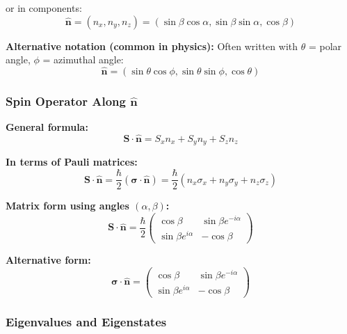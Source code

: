 \documentclass[11pt,a4paper]{article}
\begin{document}
or in components:
\begin{equation}
\hat{\mathbf{n}} = (n_x, n_y, n_z) = (\sin\beta\cos\alpha, \sin\beta\sin\alpha, \cos\beta)
\tag{S.21}
\end{equation}

\textbf{Alternative notation (common in physics):}
Often written with $\theta$ = polar angle, $\phi$ = azimuthal angle:
\begin{equation}
\hat{\mathbf{n}} = (\sin\theta\cos\phi, \sin\theta\sin\phi, \cos\theta)
\tag{S.22}
\end{equation}

\subsubsection{Spin Operator Along $\hat{\mathbf{n}}$}

\textbf{General formula:}
\begin{equation}
\boxed{\mathbf{S} \cdot \hat{\mathbf{n}} = S_x n_x + S_y n_y + S_z n_z}
\tag{S.23}
\end{equation}

\textbf{In terms of Pauli matrices:}
\begin{equation}
\boxed{\mathbf{S} \cdot \hat{\mathbf{n}} = \frac{\hbar}{2}(\boldsymbol{\sigma} \cdot \hat{\mathbf{n}}) = \frac{\hbar}{2}(n_x\sigma_x + n_y\sigma_y + n_z\sigma_z)}
\tag{S.24}
\end{equation}

\textbf{Matrix form using angles $(\alpha, \beta)$:}
\begin{equation}
\boxed{\mathbf{S} \cdot \hat{\mathbf{n}} = \frac{\hbar}{2}\begin{pmatrix}
\cos\beta & \sin\beta e^{-i\alpha} \\
\sin\beta e^{i\alpha} & -\cos\beta
\end{pmatrix}}
\tag{S.25}
\end{equation}

\textbf{Alternative form:}
\begin{equation}
\boldsymbol{\sigma} \cdot \hat{\mathbf{n}} = \begin{pmatrix}
\cos\beta & \sin\beta e^{-i\alpha} \\
\sin\beta e^{i\alpha} & -\cos\beta
\end{pmatrix}
\tag{S.26}
\end{equation}

\subsubsection{Eigenvalues and Eigenstates}
\end{document}
